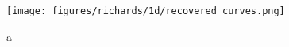 \begin{figure}[ht]
\begin{center}
\texttt{[image: figures/richards/1d/recovered\_curves.png]}
\end{center}
\caption{
a
}
\label{fig:richards-1d-recovered_curves}
\end{figure}

